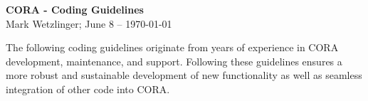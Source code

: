\documentclass[a4paper]{article}
\begin{document}
	
\begin{center}
	\Large
	\textbf{
		CORA - Coding Guidelines
	} \\ \medskip
	\small Mark Wetzlinger; June 8 -- \today
\end{center}


The following coding guidelines originate from years of experience in CORA development, maintenance, and support.
Following these guidelines ensures a more robust and sustainable development of new functionality as well as seamless integration of other code into CORA.











	
\end{document}
